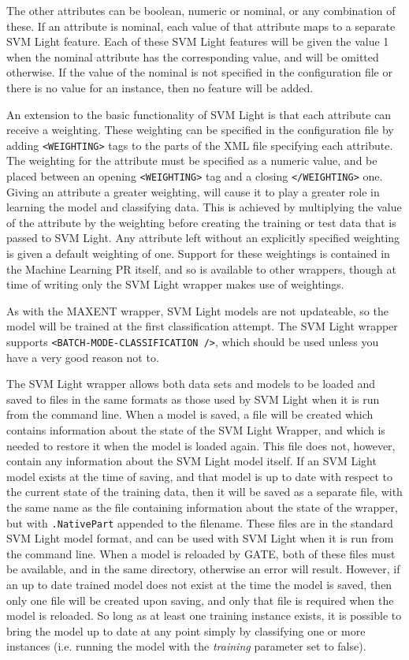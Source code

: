 The other attributes can be boolean, numeric or nominal, or any
combination of these. If an attribute is nominal, each value of that
attribute maps to a separate SVM Light feature. Each of these SVM
Light features will be given the value 1 when the nominal attribute
has the corresponding value, and will be omitted otherwise. If the
value of the nominal is not specified in the configuration file or
there is no value for an instance, then no feature will be added.

An extension to the basic functionality of SVM Light is that each
attribute can receive a weighting. These weighting can be specified in
the configuration file by adding \verb|<WEIGHTING>| tags to the parts
of the XML file specifying each attribute. The weighting for the
attribute must be specified as a numeric value, and be placed between
an opening \verb|<WEIGHTING>| tag and a closing
\verb|</WEIGHTING>| one. Giving an attribute a greater weighting, will cause it
to play a greater role in learning the model and classifying
data. This is achieved by multiplying the value of the attribute by
the weighting before creating the training or test data that is passed
to SVM Light. Any attribute left without an explicitly specified
weighting is given a default weighting of one. Support for these
weightings is contained in the Machine Learning PR itself, and so is
available to other wrappers, though at time of writing only the SVM
Light wrapper makes use of weightings.

As with the MAXENT wrapper, SVM Light models are not updateable, so
the model will be trained at the first classification attempt.  The
SVM Light wrapper supports \verb|<BATCH-MODE-CLASSIFICATION />|, which
should be used unless you have a very good reason not to.

The SVM Light wrapper allows both data sets and models to be loaded
and saved to files in the same formats as those used by SVM Light when
it is run from the command line. When a model is saved, a file will be
created which contains information about the state of the SVM Light
Wrapper, and which is needed to restore it when the model is loaded
again. This file does not, however, contain any information about the
SVM Light model itself. If an SVM Light model exists at the time of
saving, and that model is up to date with respect to the current state
of the training data, then it will be saved as a separate file, with
the same name as the file containing information about the state of
the wrapper, but with \texttt{.NativePart} appended to the
filename. These files are in the standard SVM Light model format, and
can be used with SVM Light when it is run from the command line. When
a model is reloaded by GATE, both of these files must be available,
and in the same directory, otherwise an error will result.  However,
if an up to date trained model does not exist at the time the model is
saved, then only one file will be created upon saving, and only that
file is required when the model is reloaded. So long as at least one
training instance exists, it is possible to bring the model up to date
at any point simply by classifying one or more instances (i.e. running
the model with the
\emph{training} parameter set to false).

